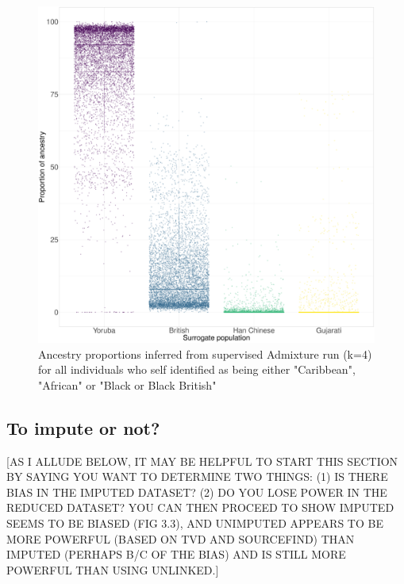\begin{figure}[htp]
    \centering
    \includegraphics[width=1.0\textwidth]{../images/chapter3/African_Inds_proportions.pdf}
    \caption{Ancestry proportions inferred from supervised Admixture run (k=4) for all individuals who self identified as being either "Caribbean", "African" or "Black or Black British"}
    \label{fig:African_Inds_proportions_ADMIXTURE}
\end{figure}

\subsection{To impute or not?}

{\color{red}[AS I ALLUDE BELOW, IT MAY BE HELPFUL TO START THIS SECTION BY SAYING YOU WANT TO DETERMINE TWO THINGS: (1) IS THERE BIAS IN THE IMPUTED DATASET? (2) DO YOU LOSE POWER IN THE REDUCED DATASET? YOU CAN THEN PROCEED TO SHOW IMPUTED SEEMS TO BE BIASED (FIG 3.3), AND UNIMPUTED APPEARS TO BE MORE POWERFUL (BASED ON TVD AND SOURCEFIND) THAN IMPUTED (PERHAPS B/C OF THE BIAS) AND IS STILL MORE POWERFUL THAN USING UNLINKED.]}

